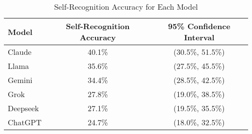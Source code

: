 \begin{table}[ht]
\centering
\renewcommand{\arraystretch}{1.3}
\begin{tabular}{l|c|c}
\hline
\textbf{Model} & \textbf{Self-Recognition Accuracy} & \textbf{95\% Confidence Interval} \\
\hline
Claude & \cellcolor{blue!15}40.1\% & \cellcolor{blue!15}(30.5\%, 51.5\%) \\
Llama & \cellcolor{blue!15}35.6\% & \cellcolor{blue!15}(27.5\%, 45.5\%) \\
Gemini & \cellcolor{blue!15}34.4\% & \cellcolor{blue!15}(28.5\%, 42.5\%) \\
Grok & \cellcolor{blue!15}27.8\% & \cellcolor{blue!15}(19.0\%, 38.5\%) \\
Deepseek & \cellcolor{blue!15}27.1\% & \cellcolor{blue!15}(19.5\%, 35.5\%) \\
ChatGPT & \cellcolor{blue!15}24.7\% & \cellcolor{blue!15}(18.0\%, 32.5\%) \\
\hline
\end{tabular}
\caption{Self-Recognition Accuracy for Each Model}
\label{tab:self-recognition-accuracy}
\end{table}